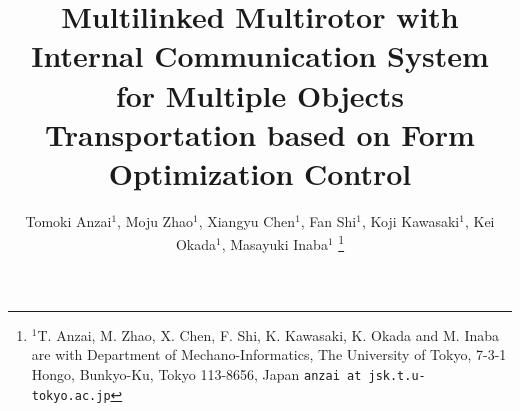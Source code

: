 \documentclass[letterpaper, 10 pt, conference]{ieeeconf}  %
\title{\LARGE \bf
  Multilinked Multirotor with Internal Communication System for Multiple Objects Transportation based on Form Optimization Control
}
\author{Tomoki Anzai$^{1}$, Moju Zhao$^{1}$, Xiangyu Chen$^{1}$, Fan Shi$^{1}$, Koji Kawasaki$^{1}$, Kei Okada$^{1}$, Masayuki Inaba$^{1}$%
\thanks{$^{1}$T. Anzai, M. Zhao, X. Chen, F. Shi, K. Kawasaki, K. Okada and M. Inaba are with Department of Mechano-Informatics, The University of Tokyo, 7-3-1 Hongo, Bunkyo-Ku, Tokyo 113-8656, Japan
       {\tt\small anzai at jsk.t.u-tokyo.ac.jp}}%
}
\begin{document}
\maketitle
\thispagestyle{empty}
\pagestyle{empty}

\begin{abstract}

\end{abstract}









\addtolength{\textheight}{-12cm}   %

%
%


      
\end{document}
